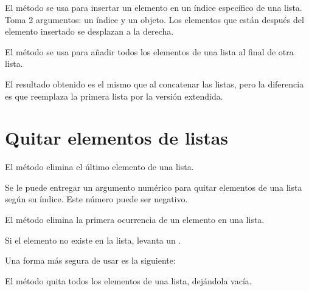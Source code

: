
El método  se usa para insertar un elemento en un índice específico de una lista.
Toma 2 argumentos: un índice y un objeto.
Los elementos que están después del elemento insertado se desplazan a la derecha.


El método  se usa para añadir todos los elementos de una lista al final de otra lista.
  

El resultado obtenido es el mismo que al concatenar las listas, pero la diferencia es que reemplaza la primera lista por la versión extendida.

\section{Quitar elementos de listas}

El método  elimina el último elemento de una lista.
  

Se le puede entregar un argumento numérico para quitar elementos de una lista según su índice.
Este número puede ser negativo.


El método  elimina la primera ocurrencia de un elemento en una lista.
  

Si el elemento no existe en la lista, levanta un .


Una forma más segura de usar  es la siguiente:


El método  quita todos los elementos de una lista, dejándola vacía.


